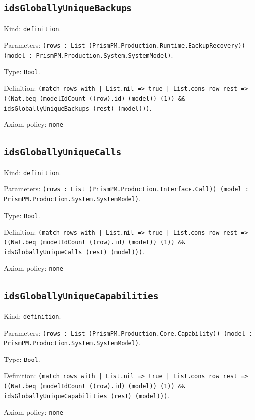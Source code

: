 \documentclass[11pt]{article}
\begin{document}
\subsection*{\texttt{idsGloballyUniqueBackups}}
\noindent Kind: \texttt{definition}.\par
\noindent Parameters: \texttt{(rows : List (PrismPM.Production.Runtime.BackupRecovery)) (model : PrismPM.Production.System.SystemModel)}.\par
\noindent Type: \texttt{Bool}.\par
\noindent Definition: \texttt{(match rows with | List.nil => true | List.cons row rest => ((Nat.beq (modelIdCount ((row).id) (model)) (1)) \&\& idsGloballyUniqueBackups (rest) (model)))}.\par
\noindent Axiom policy: \texttt{none}.\par
\subsection*{\texttt{idsGloballyUniqueCalls}}
\noindent Kind: \texttt{definition}.\par
\noindent Parameters: \texttt{(rows : List (PrismPM.Production.Interface.Call)) (model : PrismPM.Production.System.SystemModel)}.\par
\noindent Type: \texttt{Bool}.\par
\noindent Definition: \texttt{(match rows with | List.nil => true | List.cons row rest => ((Nat.beq (modelIdCount ((row).id) (model)) (1)) \&\& idsGloballyUniqueCalls (rest) (model)))}.\par
\noindent Axiom policy: \texttt{none}.\par
\subsection*{\texttt{idsGloballyUniqueCapabilities}}
\noindent Kind: \texttt{definition}.\par
\noindent Parameters: \texttt{(rows : List (PrismPM.Production.Core.Capability)) (model : PrismPM.Production.System.SystemModel)}.\par
\noindent Type: \texttt{Bool}.\par
\noindent Definition: \texttt{(match rows with | List.nil => true | List.cons row rest => ((Nat.beq (modelIdCount ((row).id) (model)) (1)) \&\& idsGloballyUniqueCapabilities (rest) (model)))}.\par
\noindent Axiom policy: \texttt{none}.\par
\end{document}
